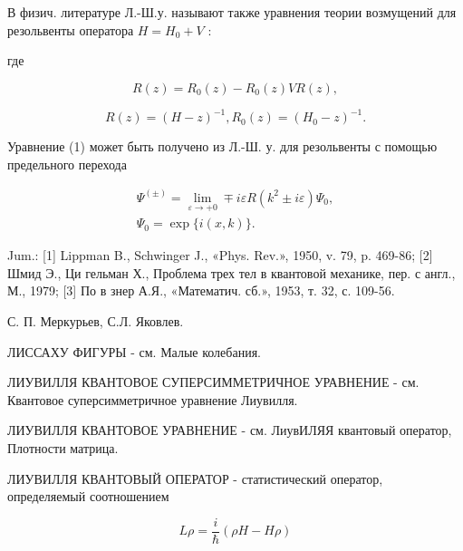 \documentclass[10pt]{article}
\begin{document}
В физич. литературе Л.-Ш.у. называют также уравнения теории возмущений для резольвенты оператора $H=H_{0}+V$ :



где



\[

R(z)=R_{0}(z)-R_{0}(z) V R(z),

\]



\[

R(z)=(H-z)^{-1}, R_{0}(z)=\left(H_{0}-z\right)^{-1} .

\]



Уравнение (1) может быть получено из Л.-Ш. у. для резольвенты с помощью предельного перехода



\[

\begin{gathered}

\Psi^{( \pm)}=\lim _{\varepsilon \rightarrow+0} \mp i \varepsilon R\left(k^{2} \pm i \varepsilon\right) \Psi_{0}, \\

\Psi_{0}=\exp \{i(x, k)\} .

\end{gathered}

\]



Jum.: [1] Lippman B., Schwinger J., «Phys. Rev.», 1950, v. 79, p. 469-86; [2] Шмид Э., Ци гельман Х., Проблема трех тел в квантовой механике, пер. с англ., М., 1979; [3] По в знер А.Я., «Математич. сб.», 1953, т. 32, с. 109-56.



С. П. Меркурьев, С.Л. Яковлев.



ЛИССАХУ ФИГУРЫ - см. Малые колебания.



ЛИУВИЛЛЯ КВАНТОВОЕ СУПЕРСИММЕТРИЧНОЕ УРАВНЕНИЕ - см. Квантовое суперсимметричное уравнение Лиувилля.



ЛИУВИЛЛЯ КВАНТОВОЕ УРАВНЕНИЕ - см. ЛиувИЛЯЯ квантовый оператор, Плотности матрица.



ЛИУВИЛЛЯ КВАНТОВЫЙ ОПЕРАТОР - статистический оператор, определяемый соотношением



\[

L \rho=\frac{i}{\hbar}(\rho H-H \rho)

\]
\end{document}
